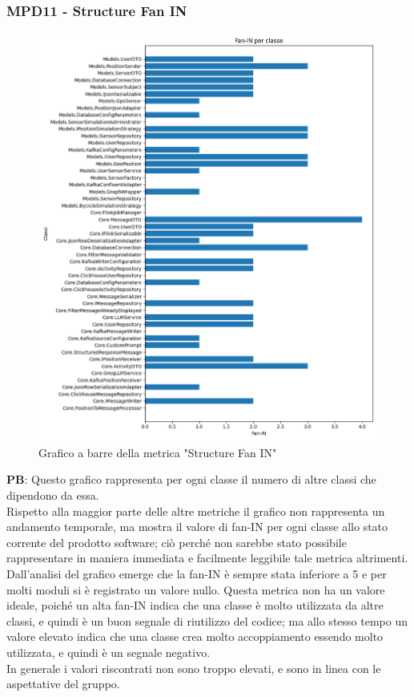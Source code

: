 \documentclass[10pt]{article}
\begin{document}
\begin{justify}
\subsubsection{MPD11 - Structure Fan IN}

\begin{figure}[H]
  \centering
  \includegraphics[width=0.9\linewidth]{metrics_fan_in.png}
  \caption{Grafico a barre della metrica "Structure Fan IN"}
\end{figure}

\textbf{PB}: Questo grafico rappresenta per ogni classe il numero di altre classi che dipendono da essa.\\
Rispetto alla maggior parte delle altre metriche il grafico non rappresenta un andamento temporale, ma mostra il valore di fan-IN per ogni classe allo stato 
corrente del prodotto software; ciò perché non sarebbe stato possibile rappresentare in maniera immediata e  facilmente leggibile tale metrica altrimenti.\\
Dall'analisi del grafico emerge che la fan-IN è sempre stata inferiore a 5 e per molti moduli si è registrato un valore nullo. Questa metrica non ha un valore ideale,
poiché un alta fan-IN indica che una classe è molto utilizzata da altre classi, e quindi è un buon segnale di riutilizzo del codice; ma allo stesso tempo un valore 
elevato indica che una classe crea molto accoppiamento essendo molto utilizzata, e quindi è un segnale negativo.\\ In generale i valori riscontrati non sono troppo 
elevati, e sono in linea con le aspettative del gruppo.\\



\end{justify}
\end{document}
